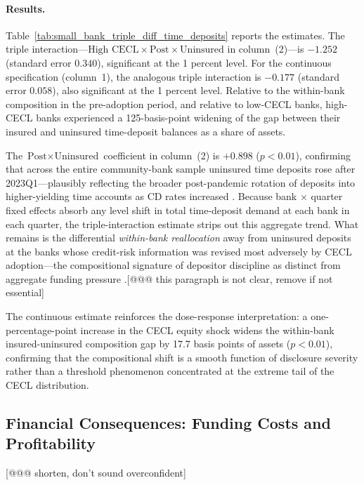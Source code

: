 \paragraph{Results.}
Table~\ref{tab:small_bank_triple_diff_time_deposits} reports the estimates.  The
triple interaction---$\text{High CECL} \times \text{Post} \times
\text{Uninsured}$ in column~(2)---is $-1.252$ (standard error $0.340$),
significant at the 1 percent level.  For the continuous specification
(column~1), the analogous triple interaction is $-0.177$ (standard error
$0.058$), also significant at the 1 percent level.  Relative to the within-bank
composition in the pre-adoption period, and relative to low-CECL banks, high-CECL
banks experienced a 125-basis-point widening of the gap between their insured and
uninsured time-deposit balances as a share of assets.  

The $\text{Post} \times \text{Uninsured}$ coefficient in column~(2) is $+0.898$
($p < 0.01$), confirming that across the entire community-bank sample uninsured
time deposits rose after 2023Q1---plausibly reflecting the broader post-pandemic
rotation of deposits into higher-yielding time accounts as CD rates increased
\citep{drechsler2017deposits}.  Because bank $\times$ quarter fixed effects absorb
any level shift in total time-deposit demand at each bank in each quarter, the
triple-interaction estimate strips out this aggregate trend.  What remains is the
differential \emph{within-bank reallocation} away from uninsured deposits at the
banks whose credit-risk information was revised most adversely by CECL
adoption---the compositional signature of depositor discipline as distinct from
aggregate funding pressure \citep{chen2022bank}.[@@@ this paragraph is not clear, remove if not essential]

The continuous estimate reinforces the dose-response interpretation: a
one-percentage-point increase in the CECL equity shock widens the within-bank
insured-uninsured composition gap by 17.7 basis points of assets ($p < 0.01$),
confirming that the compositional shift is a smooth function of disclosure
severity rather than a threshold phenomenon concentrated at the extreme tail of
the CECL distribution.

\subsection{Financial Consequences: Funding Costs and Profitability} [@@@ shorten, don't sound overconfident]
\label{sec:results:financial}

